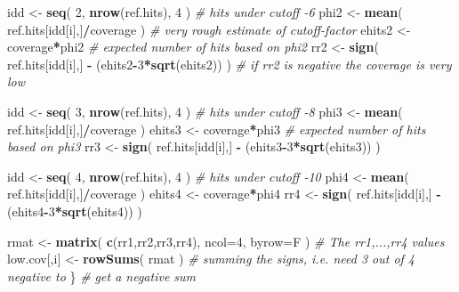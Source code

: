 \documentclass[]{article}
\newenvironment{Shaded}{\begin{snugshade}}{\end{snugshade}}
\newcommand{\KeywordTok}[1]{\textcolor[rgb]{0.13,0.29,0.53}{\textbf{#1}}}
\newcommand{\DataTypeTok}[1]{\textcolor[rgb]{0.13,0.29,0.53}{#1}}
\newcommand{\DecValTok}[1]{\textcolor[rgb]{0.00,0.00,0.81}{#1}}
\newcommand{\StringTok}[1]{\textcolor[rgb]{0.31,0.60,0.02}{#1}}
\newcommand{\CommentTok}[1]{\textcolor[rgb]{0.56,0.35,0.01}{\textit{#1}}}
\newcommand{\OperatorTok}[1]{\textcolor[rgb]{0.81,0.36,0.00}{\textbf{#1}}}
\newcommand{\NormalTok}[1]{#1}
\begin{document}
\begin{Shaded}
\begin{Highlighting}[]
  
\NormalTok{  idd <-}\StringTok{ }\KeywordTok{seq}\NormalTok{( }\DecValTok{2}\NormalTok{, }\KeywordTok{nrow}\NormalTok{(ref.hits), }\DecValTok{4}\NormalTok{ )                          }\CommentTok{# hits under cutoff -6}
\NormalTok{  phi2 <-}\StringTok{ }\KeywordTok{mean}\NormalTok{( ref.hits[idd[i],]}\OperatorTok{/}\NormalTok{coverage )                  }\CommentTok{# very rough estimate of cutoff-factor}
\NormalTok{  ehits2 <-}\StringTok{ }\NormalTok{coverage}\OperatorTok{*}\NormalTok{phi2                                     }\CommentTok{# expected number of hits based on phi2}
\NormalTok{  rr2 <-}\StringTok{ }\KeywordTok{sign}\NormalTok{( ref.hits[idd[i],] }\OperatorTok{-}\StringTok{ }\NormalTok{(ehits2}\OperatorTok{-}\DecValTok{3}\OperatorTok{*}\KeywordTok{sqrt}\NormalTok{(ehits2)) )  }\CommentTok{# if rr2 is negative the coverage is very low}

\NormalTok{  idd <-}\StringTok{ }\KeywordTok{seq}\NormalTok{( }\DecValTok{3}\NormalTok{, }\KeywordTok{nrow}\NormalTok{(ref.hits), }\DecValTok{4}\NormalTok{ )                          }\CommentTok{# hits under cutoff -8}
\NormalTok{  phi3 <-}\StringTok{ }\KeywordTok{mean}\NormalTok{( ref.hits[idd[i],]}\OperatorTok{/}\NormalTok{coverage )                  }
\NormalTok{  ehits3 <-}\StringTok{ }\NormalTok{coverage}\OperatorTok{*}\NormalTok{phi3                                     }\CommentTok{# expected number of hits based on phi3 }
\NormalTok{  rr3 <-}\StringTok{ }\KeywordTok{sign}\NormalTok{( ref.hits[idd[i],] }\OperatorTok{-}\StringTok{ }\NormalTok{(ehits3}\OperatorTok{-}\DecValTok{3}\OperatorTok{*}\KeywordTok{sqrt}\NormalTok{(ehits3)) )}

\NormalTok{  idd <-}\StringTok{ }\KeywordTok{seq}\NormalTok{( }\DecValTok{4}\NormalTok{, }\KeywordTok{nrow}\NormalTok{(ref.hits), }\DecValTok{4}\NormalTok{ )                          }\CommentTok{# hits under cutoff -10}
\NormalTok{  phi4 <-}\StringTok{ }\KeywordTok{mean}\NormalTok{( ref.hits[idd[i],]}\OperatorTok{/}\NormalTok{coverage )}
\NormalTok{  ehits4 <-}\StringTok{ }\NormalTok{coverage}\OperatorTok{*}\NormalTok{phi4}
\NormalTok{  rr4 <-}\StringTok{ }\KeywordTok{sign}\NormalTok{( ref.hits[idd[i],] }\OperatorTok{-}\StringTok{ }\NormalTok{(ehits4}\OperatorTok{-}\DecValTok{3}\OperatorTok{*}\KeywordTok{sqrt}\NormalTok{(ehits4)) )}
  
\NormalTok{  rmat <-}\StringTok{ }\KeywordTok{matrix}\NormalTok{( }\KeywordTok{c}\NormalTok{(rr1,rr2,rr3,rr4), }\DataTypeTok{ncol=}\DecValTok{4}\NormalTok{, }\DataTypeTok{byrow=}\NormalTok{F )       }\CommentTok{# The rr1,...,rr4 values}
\NormalTok{  low.cov[,i] <-}\StringTok{ }\KeywordTok{rowSums}\NormalTok{( rmat )                              }\CommentTok{# summing the signs, i.e. need 3 out of 4 negative to}
\NormalTok{\}                                                             }\CommentTok{# get a negative sum}
\end{Highlighting}
\end{Shaded}
\end{document}
